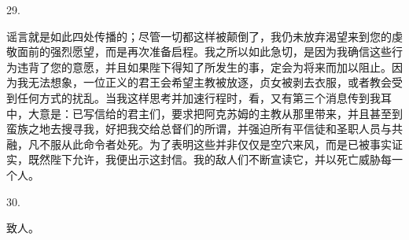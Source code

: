 29. \par

谣言就是如此四处传播的；尽管一切都这样被颠倒了，我仍未放弃渴望来到您的虔敬面前的强烈愿望，而是再次准备启程。我之所以如此急切，是因为我确信这些行为违背了您的意愿，并且如果陛下得知了所发生的事，定会为将来而加以阻止。因为我无法想象，一位正义的君王会希望主教被放逐，贞女被剥去衣服，或者教会受到任何方式的扰乱。当我这样思考并加速行程时，看，又有第三个消息传到我耳中，大意是：已写信给的君主们，要求把阿克苏姆的主教从那里带来，并且甚至到蛮族之地去搜寻我，好把我交给总督们的所谓，并强迫所有平信徒和圣职人员与共融，凡不服从此命令者处死。为了表明这些并非仅仅是空穴来风，而是已被事实证实，既然陛下允许，我便出示这封信。我的敌人们不断宣读它，并以死亡威胁每一个人。\par

30. \par

致人。\par

